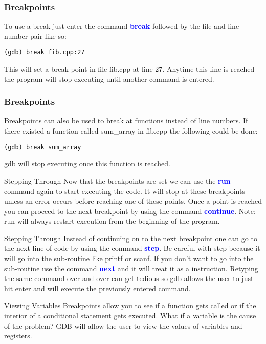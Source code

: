 \documentclass[11pt]{beamer}
\begin{document}
\begin{frame}[fragile]
\frametitle{Breakpoints}
To use a break just enter the command \textbf{\textcolor{blue}{break}} followed by the file and line number pair like so:
\begin{lstlisting}[style=BashInputStyle]
(gdb) break fib.cpp:27
\end{lstlisting}
This will set a break point in file fib.cpp at line 27. Anytime this line is reached the program will stop executing until another command is entered. 
\end{frame}

\begin{frame}[fragile]
\frametitle{Breakpoints}
Breakpoints can also be used to break at functions instead of line numbers. If there existed a function called sum\_array in fib.cpp the following could be done:
\begin{lstlisting}[style=BashInputStyle]
(gdb) break sum_array
\end{lstlisting}
gdb will stop executing once this function is reached.
\end{frame}

\begin{frame}{Stepping Through}
Now that the breakpoints are set we can use the \textbf{\textcolor{blue}{run}} command again to start executing the code. It will stop at these breakpoints unless an error occurs before reaching one of these points. 
\break
\break
Once a point is reached you can proceed to the next breakpoint by using the command \textbf{\textcolor{blue}{continue}}. 
\break
\break
Note: run will always restart execution from the beginning of the program.
\end{frame}

\begin{frame}{Stepping Through}
Instead of continuing on to the next breakpoint one can go to the next line of code by using the command \textbf{\textcolor{blue}{step}}. 
\break
\break
Be careful with step because it will go into the sub-routine like printf or scanf. If you don't want to go into the sub-routine use the command \textbf{\textcolor{blue}{next}} and it will treat it as a instruction.
\break
\break
Retyping the same command over and over can get tedious so gdb allows the user to just hit enter and will execute the previously entered command.
\end{frame}

\begin{frame}{Viewing Variables}
Breakpoints allow you to see if a function gets called or if the interior of a conditional statement gets executed.
\break
\break
What if a variable is the cause of the problem? 
\break
\break
GDB will allow the user to view the values of variables and registers.
\end{frame}
\end{document}
